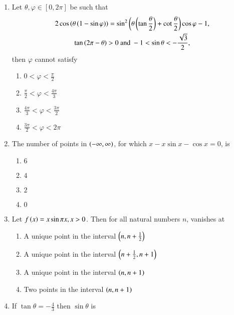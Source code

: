 \begin{enumerate}[label=\thesubsection.\arabic*,ref=\thesubsection.\theenumi]
\item Let $\theta, \varphi \in [0,2\pi]$ be such that 
\begin{multline*}
	2 \cos\left(\theta\left(1-\sin \varphi\right)\right)= \sin^2\left(\theta\left(\tan\frac{\theta}{2}\right)+\cot\frac{\theta}{2}\right)\cos \varphi-1, 
	\\
\tan\left(2\pi-\theta\right)>0 \text{ and } -1<\sin{\theta}<-\frac{\sqrt{3}}{2}, 
\end{multline*}
then $\varphi$ cannot satisfy \hfill{}
\begin{multicols}{4}
\begin{enumerate}
    \item $0<\varphi<\frac{\pi}{2}$
    \item $\frac{\pi}{2}<\varphi<\frac{4\pi}{3}$
    \item $\frac{4\pi}{3}<\varphi<\frac{3\pi}{2}$
    \item $\frac{3\pi}{2}<\varphi<2\pi$
\end{enumerate}
\end{multicols}
\item The number of points in $\left(-\infty, \infty\right)$, for which $x - x \sin x - \cos x = 0$, is \hfill{}
\begin{multicols}{4}
\begin{enumerate}
    \item $6$
    \item $4$
    \item $2$
    \item $0$
\end{enumerate}
\end{multicols}
\item Let $f\left(x\right)=x\sin\pi x,  x>0 $. Then for all  natural numbers $n$,  vanishes at 
\hfill{}
\begin{enumerate}
    \item A unique point in the interval $\left(n,n+\frac{1}{2}\right)$
    \item A unique point in the interval $\left(n+\frac{1}{2},n+1\right)$
    \item A unique point in the interval $\left(n,n+1\right)$
    \item Two points in the interval $\left(n,n+1\right)$
\end{enumerate}
	\item If $\tan\theta =-\frac{4}{3}$ then $\sin \theta$ is 
		\hfill{}
		

\end{enumerate}
